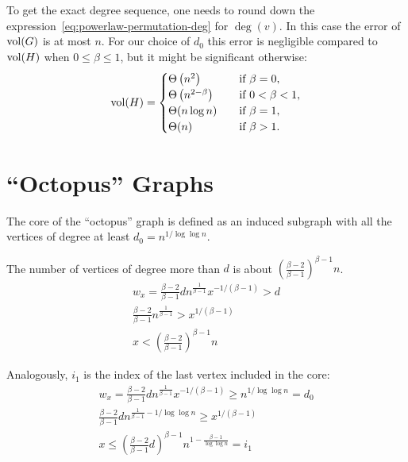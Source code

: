 To get the exact degree sequence, one needs to round down
the expression~\eqref{eq:powerlaw-permutation-deg} for $\deg(v)$.
In this case the error of $\operatorname*{vol}(G)$ is at most $n$.
For our choice of $d_0$ this error is negligible compared to $\operatorname*{vol}(H)$
when $0\leq\beta\leq1$, but it might be significant otherwise:
\begin{equation}
    \operatorname*{vol}(H)=
    \begin{cases}
        \Theta\left(n^2\right) & \quad \text{if } \beta=0,\\
        \Theta\left(n^{2-\beta}\right) & \quad \text{if } 0<\beta<1,\\
        \Theta(n \log n) & \quad \text{if } \beta=1,\\
        \Theta(n) & \quad \text{if } \beta>1.
    \end{cases}
\end{equation}

\section{\texorpdfstring{``Octopus''}{"Octopus"} Graphs}

The core of the ``octopus'' graph is defined as an induced subgraph
with all the vertices of degree at least $d_0=n^{1/\log\log n}$.



The number of vertices of degree more than $d$
is about $\left(\frac{\beta-2}{\beta-1}\right)^{\beta-1}n$.
\begin{gather*}
    w_x=\frac{\beta-2}{\beta-1}dn^{\frac{1}{\beta-1}}x^{-1/(\beta-1)}>d\\
    \frac{\beta-2}{\beta-1}n^{\frac{1}{\beta-1}}>x^{1/(\beta-1)}\\
    x<\left(\frac{\beta-2}{\beta-1}\right)^{\beta-1}n
\end{gather*}

Analogously, $i_1$ is the index of the last vertex included in the core:
\begin{gather*}
    w_x=\frac{\beta-2}{\beta-1}dn^{\frac{1}{\beta-1}}x^{-1/(\beta-1)}\geq n^{1/\log\log n}=d_0\\
    \frac{\beta-2}{\beta-1}dn^{\frac{1}{\beta-1}-1/\log\log n}\geq x^{1/(\beta-1)}\\
    x\leq\left(\frac{\beta-2}{\beta-1}d\right)^{\beta-1}n^{1-\frac{\beta-1}{\log\log n}}=i_1
\end{gather*}

